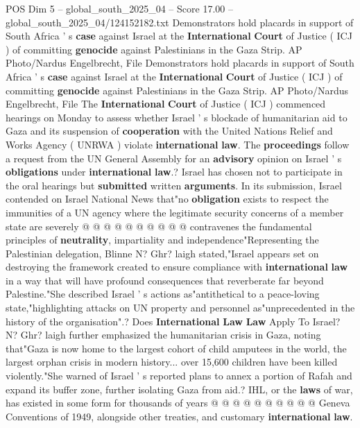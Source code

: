 \begin{textsample}{POS Dim 5 – global\_south\_2025\_04 – Score 17.00 – global\_south\_2025\_04/124152182.txt}  \label{ex:f5_pos_063}
Demonstrators hold placards in support of South Africa ' s \textbf{case} against Israel at the \textbf{International} \textbf{Court} of Justice ( ICJ ) of committing \textbf{genocide} against Palestinians in the Gaza Strip.
AP Photo/Nardus Engelbrecht, File Demonstrators hold placards in support of South Africa ' s \textbf{case} against Israel at the \textbf{International} \textbf{Court} of Justice ( ICJ ) of committing \textbf{genocide} against Palestinians in the Gaza Strip.
AP Photo/Nardus Engelbrecht, File The \textbf{International} \textbf{Court} of Justice ( ICJ ) commenced hearings on Monday to assess whether Israel ' s blockade of humanitarian aid to Gaza and its suspension of \textbf{cooperation} with the United Nations Relief and Works Agency ( UNRWA ) violate \textbf{international} \textbf{law}.
The \textbf{proceedings} follow a request from the UN General Assembly for an \textbf{advisory} opinion on Israel ' s \textbf{obligations} under \textbf{international} \textbf{law}.?
Israel has chosen not to participate in the oral hearings but \textbf{submitted} written \textbf{arguments}.
In its submission, Israel contended on Israel National News that"no \textbf{obligation} exists to respect the immunities of a UN agency where the legitimate security concerns of a member state are severely @ @ @ @ @ @ @ @ @ @ contravenes the fundamental principles of \textbf{neutrality}, impartiality and independence"Representing the Palestinian delegation, Blinne N?
Ghr? laigh stated,"Israel appears set on destroying the framework created to ensure compliance with \textbf{international} \textbf{law} in a way that will have profound consequences that reverberate far beyond Palestine."She described Israel ' s actions as"antithetical to a peace-loving state,"highlighting attacks on UN property and personnel as"unprecedented in the history of the organisation".?
Does \textbf{International} \textbf{Law} \textbf{Law} Apply To Israel?
N?
Ghr? laigh further emphasized the humanitarian crisis in Gaza, noting that"Gaza is now home to the largest cohort of child amputees in the world, the largest orphan crisis in modern history... over 15,600 children have been killed violently."She warned of Israel ' s reported plans to annex a portion of Rafah and expand its buffer zone, further isolating Gaza from aid.?
IHL, or the \textbf{laws} of war, has existed in some form for thousands of years @ @ @ @ @ @ @ @ @ @ Geneva Conventions of 1949, alongside other treaties, and customary \textbf{international} \textbf{law}.

\end{textsample}
